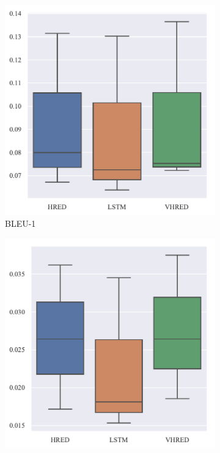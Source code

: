 \begin{figure}[H]
    \begin{subfigure}{0.5\linewidth}
        \centering
        \includegraphics[width=\linewidth]{figure/boxplot/model/bleu_1/plot.pdf}
        \caption{BLEU-1}
    \end{subfigure}%
    \begin{subfigure}{0.5\linewidth}
        \centering
        \includegraphics[width=\linewidth]{figure/boxplot/model/bleu_2/plot.pdf}

\end{subfigure}
\end{figure}
